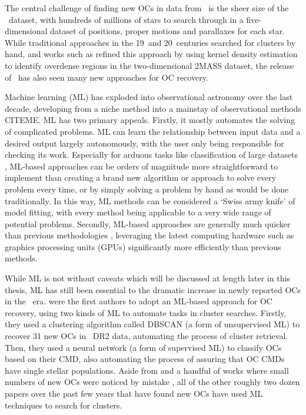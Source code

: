 The central challenge of finding new OCs in data from \gaia\ is the sheer size of the \gaia\ dataset, with hundreds of millions of stars to search through in a five-dimensional dataset of positions, proper motions and parallaxes for each star. While traditional approaches in the 19\third\ and 20\third\ centuries searched for clusters by hand, and works such as \cite{froebrich_systematic_2007} refined this approach by using kernel density estimation to identify overdense regions in the two-dimensional 2MASS dataset, the release of \gaia\ has also seen many new approaches for OC recovery.

Machine learning (ML) has exploded into observational astronomy over the last decade, developing from a niche method into a mainstay of observational methods CITEME. ML has two primary appeals. Firstly, it mostly automates the solving of complicated problems. ML can learn the relationship between input data and a desired output largely autonomously, with the user only being responsible for checking its work. Especially for arduous tasks like classification of large datasets \citep[e.g.][]{killestein_transient-optimised_2021}, ML-based approaches can be orders of magnitude more straightforward to implement than creating a brand new algorithm or approach to solve every problem every time, or by simply solving a problem by hand as would be done traditionally. In this way, ML methods can be considered a `Swiss army knife' of model fitting, with every method being applicable to a very wide range of potential problems. Secondly, ML-based approaches are generally much quicker than previous methodologies \citep{hunt_improving_2021}, leveraging the latest computing hardware such as graphics processing units (GPUs) significantly more efficiently than previous methods.

While ML is not without caveats which will be discussed at length later in this thesis, ML has still been essential to the dramatic increase in newly reported OCs in the \gaia\ era. \cite{castro-ginard_new_2018} were the first authors to adopt an ML-based approach for OC recovery, using two kinds of ML to automate tasks in cluster searches. Firstly, they used a clustering algorithm called DBSCAN (a form of unsupervised ML) to recover 31 new OCs in \gaia\ DR2 data, automating the process of cluster retrieval. Then, they used a neural network (a form of supervised ML) to classify OCs based on their CMD, also automating the process of assuring that OC CMDs have single stellar populations. Aside from \cite{sim_207_2019} and a handful of works where small numbers of new OCs were noticed by mistake \citep[e.g.][]{zari_3d_2018,bastian_gaia_2019,anders_ngc_2022-1}, all of the other roughly two dozen papers over the past few years that have found new OCs have used ML techniques to search for clusters.

